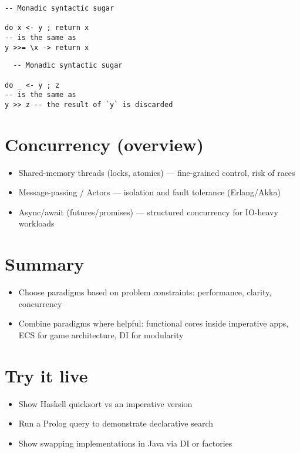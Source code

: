\documentclass{article}
\begin{document}
\begin{verbatim}
-- Monadic syntactic sugar

do x <- y ; return x
-- is the same as
y >>= \x -> return x 
\end{verbatim}

\begin{verbatim}
  -- Monadic syntactic sugar

do _ <- y ; z
-- is the same as
y >> z -- the result of `y` is discarded
\end{verbatim}

\pagebreak

\section{Concurrency (overview)}
\begin{itemize}
  \item Shared-memory threads (locks, atomics) — fine-grained control, risk of races
  \item Message-passing / Actors — isolation and fault tolerance (Erlang/Akka)
  \item Async/await (futures/promises) — structured concurrency for IO-heavy workloads
\end{itemize}

\pagebreak

\section{Summary}
\begin{itemize}
  \item Choose paradigms based on problem constraints: performance, clarity, concurrency
  \item Combine paradigms where helpful: functional cores inside imperative apps, ECS for game architecture, DI for modularity
\end{itemize}

\pagebreak

\section*{Try it live}
\begin{itemize}
  \item Show Haskell quicksort vs an imperative version
  \item Run a Prolog query to demonstrate declarative search
  \item Show swapping implementations in Java via DI or factories
\end{itemize}
\end{document}
